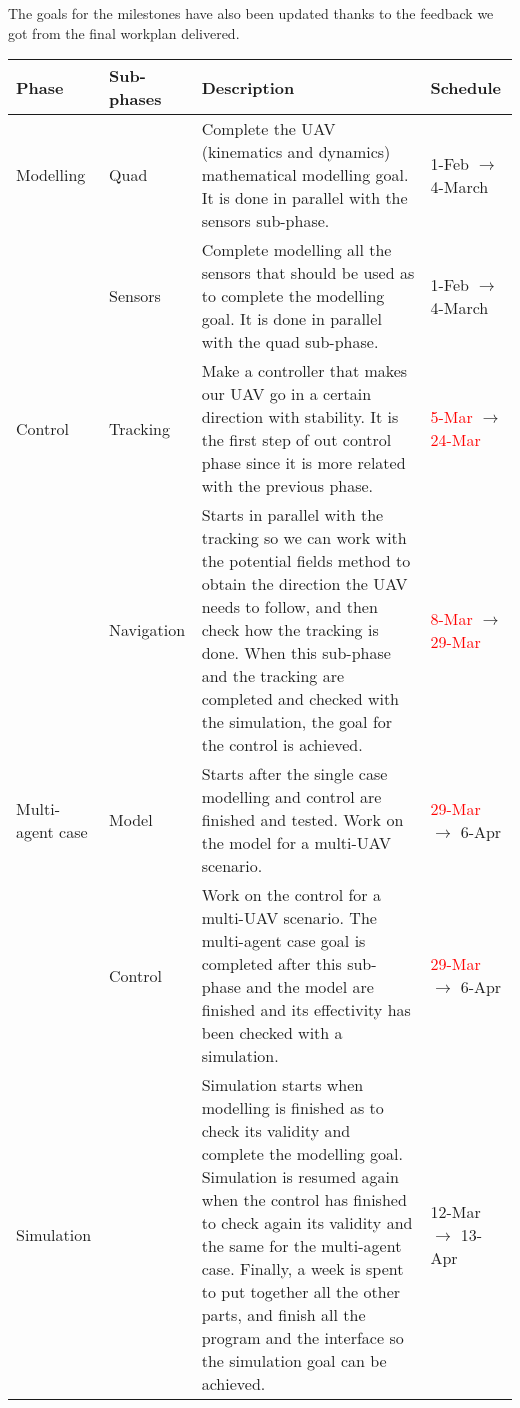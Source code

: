 \documentclass{article}
\begin{document}
The goals for the milestones have also been updated thanks to the feedback we got from the final workplan delivered.
	\begin{center}
	\begin{tabular}[H]{|C{2cm}|C{2cm}|C{7cm}|C{3cm}|} \hline
		Phase & Sub-phases & Description & Schedule\\ \hline
		Modelling & Quad & Complete the UAV (kinematics and dynamics) mathematical modelling goal. It is done in parallel with the sensors sub-phase. &  1-Feb $\rightarrow$ 4-March  \\ 
		& Sensors & Complete modelling all the sensors that should be used as to complete the modelling goal. It is done in parallel with the quad sub-phase. & 1-Feb $\rightarrow$ 4-March \\ \hline
		
		Control & Tracking & Make a controller that makes our UAV go in a certain direction with stability. It is the first step of out control phase since it is more related with the previous phase. &  \textcolor{red}{5-Mar} $\rightarrow$ \textcolor{red}{24-Mar}\\ 
		&Navigation & Starts in parallel with the tracking so we can work with the potential fields method to obtain the direction the UAV needs to follow, and then check how the tracking is done. When this sub-phase and the tracking are completed and checked with the simulation, the goal for the control is achieved. & \textcolor{red}{8-Mar} $\rightarrow$ \textcolor{red}{29-Mar} \\ \hline
		
		Multi-agent case & Model & Starts after the single case modelling and control are finished and tested. Work on the model for a multi-UAV scenario. & \textcolor{red}{29-Mar} $\rightarrow$ 6-Apr\\ 
		&Control & Work on the control for a multi-UAV scenario. The multi-agent case goal is completed after this sub-phase and the model are finished and its effectivity has been checked with a simulation. & \textcolor{red}{29-Mar} $\rightarrow$ 6-Apr \\ \hline
		
		Simulation & & Simulation starts when modelling is finished as to check its validity and complete the modelling goal. Simulation is resumed again when the control has finished to check again its validity and the same for the multi-agent case. Finally, a week is spent to put together all the other parts, and finish all the program and the interface so the simulation goal can be achieved. & 12-Mar $\rightarrow$ 13-Apr \\ \hline
		

\end{tabular}
\end{center}
\end{document}
